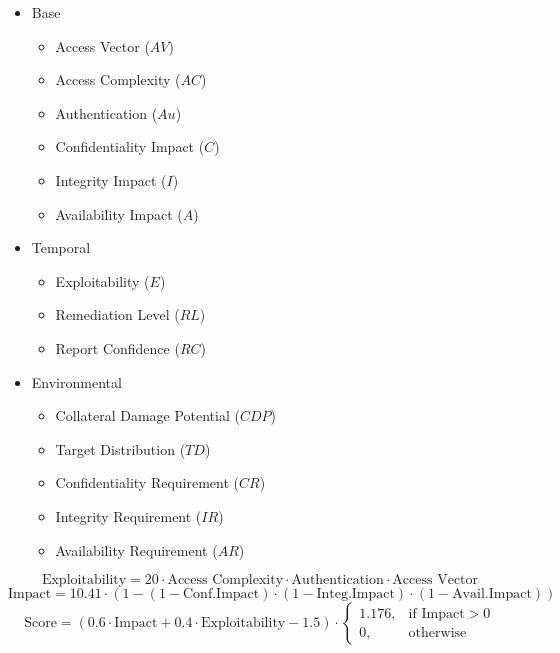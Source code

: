 \documentclass[a4paper,12pt]{article}
\begin{document}
	\begin{multicols}{2}
		\begin{itemize}
			\item Base
				\begin{itemize}
					\item Access Vector ($AV$)
					\item Access Complexity ($AC$)
					\item Authentication ($Au$)
					\item Confidentiality Impact ($C$)
					\item Integrity Impact ($I$)
					\item Availability Impact ($A$)
				\end{itemize}
			\item Temporal
				\begin{itemize}
					\item Exploitability ($E$)
					\item Remediation Level ($RL$)
					\item Report Confidence ($RC$)
				\end{itemize}
			\item Environmental
				\begin{itemize}
					\item Collateral Damage Potential ($CDP$)
					\item Target Distribution ($TD$)
					\item Confidentiality Requirement ($CR$)
					\item Integrity Requirement ($IR$)
					\item Availability Requirement ($AR$)
				\end{itemize}
		\end{itemize}
	\end{multicols}
	
	\begin{equation} \label{eq:cvssexp}
		\textrm{Exploitability} = 20 \cdot \textrm{Access Complexity} \cdot \textrm{Authentication} \cdot \textrm{Access Vector}
	\end{equation}
	\begin{equation} \label{eq:cvssimp}
		\textrm{Impact} = 10.41 \cdot (1 - (1 - \textrm{Conf.Impact}) \cdot (1 - \textrm{Integ.Impact}) \cdot (1 - \textrm{Avail.Impact}))
	\end{equation}
	\begin{equation} \label{eq:cvss}
		\textrm{Score} = (0.6 \cdot \textrm{Impact} + 0.4 \cdot \textrm{Exploitability} - 1.5) \cdot
		\begin{cases}
			1.176, & \text{if Impact} > 0\\
			0, & \text{otherwise}
		\end{cases}
	\end{equation}
	
\end{document}
